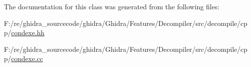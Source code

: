 The documentation for this class was generated from the following files\+:\begin{DoxyCompactItemize}
\item 
F\+:/re/ghidra\+\_\+sourcecode/ghidra/\+Ghidra/\+Features/\+Decompiler/src/decompile/cpp/\mbox{\hyperlink{condexe_8hh}{condexe.\+hh}}\item 
F\+:/re/ghidra\+\_\+sourcecode/ghidra/\+Ghidra/\+Features/\+Decompiler/src/decompile/cpp/\mbox{\hyperlink{condexe_8cc}{condexe.\+cc}}\end{DoxyCompactItemize}
